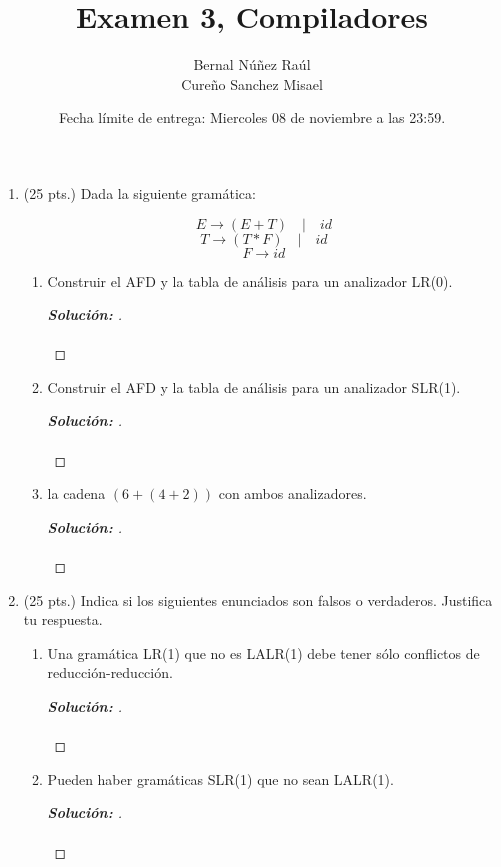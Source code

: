 \documentclass{article}
\title{Examen 3, Compiladores}
\author{
Bernal Núñez Raúl \\
Cureño Sanchez Misael
}
\date{Fecha límite de entrega: Miercoles 08 de noviembre a las 23:59.}
\begin{document}
\maketitle
\begin{enumerate}
  \item (25 pts.) Dada la siguiente gramática:

  $$E \rightarrow (E + T) \quad | \quad \textit{id} $$
  $$T \rightarrow (T * F) \quad | \quad \textit{id} $$
  $$F \rightarrow \textit{id} $$

  \begin{enumerate}
      \item Construir el AFD y la tabla de análisis para un analizador LR(0).
      \begin{proof}[\textbf{Solución: }]
        \quad \\ \\
      \end{proof}
      
      \item Construir el AFD y la tabla de análisis para un analizador SLR(1).
      \begin{proof}[\textbf{Solución: }]
        \quad \\ \\
      \end{proof}
      
      \item la cadena $(6 + (4 + 2))$ con ambos analizadores.
      \begin{proof}[\textbf{Solución: }]
        \quad \\ \\
      \end{proof}
  \end{enumerate}

  \item (25 pts.) Indica si los siguientes enunciados son falsos o verdaderos. Justifica tu respuesta.
  \begin{enumerate}
      \item Una gramática LR(1) que no es LALR(1) debe tener sólo conflictos de reducción-reducción.
      \begin{proof}[\textbf{Solución: }]
        \quad \\ \\
      \end{proof}
      
      \item Pueden haber gramáticas SLR(1) que no sean LALR(1).
      \begin{proof}[\textbf{Solución: }]
        \quad \\ \\
      \end{proof}
  \end{enumerate}


\end{enumerate}
\end{document}
